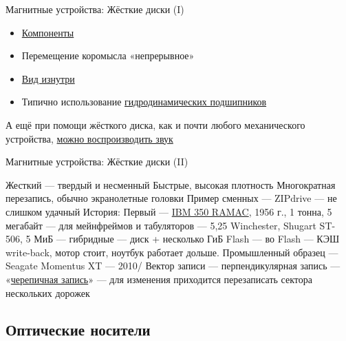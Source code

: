 \documentclass[xetex,aspectratio=43]{beamer}
\begin{document}
\begin{frame}{Магнитные устройства: Жёсткие диски (I)}

\begin{itemize}
\item
  \href{https://en.wikipedia.org/wiki/Hard_disk_drive\#Components}{Компоненты}
\item Перемещение коромысла «непрерывное»
\item
  \href{https://commons.wikimedia.org/w/index.php?title=File\%3AHardDisk1.ogv}{Вид
  изнутри}
\item
  Типично использование
  \href{https://ru.wikipedia.org/wiki/\%D0\%93\%D0\%B8\%D0\%B4\%D1\%80\%D0\%B0\%D0\%B2\%D0\%BB\%D0\%B8\%D1\%87\%D0\%B5\%D1\%81\%D0\%BA\%D0\%B8\%D0\%B5_\%D0\%B8_\%D0\%BF\%D0\%BD\%D0\%B5\%D0\%B2\%D0\%BC\%D0\%B0\%D1\%82\%D0\%B8\%D1\%87\%D0\%B5\%D1\%81\%D0\%BA\%D0\%B8\%D0\%B5_\%D0\%BF\%D0\%BE\%D0\%B4\%D1\%88\%D0\%B8\%D0\%BF\%D0\%BD\%D0\%B8\%D0\%BA\%D0\%B8}{гидродинамических подшипников}
\end{itemize}

\pause

А ещё при помощи жёсткого диска, как и почти любого механического
устройства, \href{https://youtu.be/pmfHHLfbjNQ}{можно воспроизводить
звук}
\end{frame}

\begin{frame}{Магнитные устройства:  Жёсткие диски (II)}

\begin{outline}
    \tightlist
    \1 Жесткий --- твердый и несменный
    \1 Быстрые, высокая плотность
    \1 Многократная перезапись, обычно экранолетные головки
    \1 Пример сменных --- ZIPdrive --- не слишком удачный
    \1 История:
        \2 Первый --- \href{https://en.wikipedia.org/wiki/IBM_305_RAMAC}{IBM 350 RAMAC}, 1956 г., 1 тонна, 5 мегабайт --- для мейнфреймов и табуляторов
         --- 5,25 Winchester, Shugart ST-506, 5 МиБ
         --- гибридные --- диск + несколько ГиБ Flash --- во Flash --- КЭШ write-back, мотор стоит, ноутбук работает дольше. Промышленный образец --- Seagate Momentus XT --- 2010/
        \2 Вектор записи
             --- перпендикулярная запись
             --- «\href{https://en.wikipedia.org/wiki/Shingled\_magnetic\_recording}{черепичная запись}» --- для изменения приходится перезаписать сектора нескольких дорожек
\end{outline}
\end{frame}

\subsection{Оптические носители}
\end{document}
